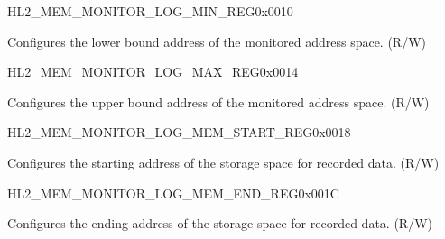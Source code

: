 \begin{register}{H}{L2\_MEM\_MONITOR\_LOG\_MIN\_REG}{0x0010}\label{regdesc:L2MEMMONITORLOGMINREG}
%
\regnewline%
\begin{regdesc}\begin{reglist}
\label{fielddesc:L2MEMMONITORLOGMIN}\item [L2\_MEM\_MONITOR\_LOG\_MIN] Configures the lower bound address of the monitored address space. (R/W)
\end{reglist}\end{regdesc}
\end{register}


\begin{register}{H}{L2\_MEM\_MONITOR\_LOG\_MAX\_REG}{0x0014}\label{regdesc:L2MEMMONITORLOGMAXREG}
%
\regnewline%
\begin{regdesc}\begin{reglist}
\label{fielddesc:L2MEMMONITORLOGMAX}\item [L2\_MEM\_MONITOR\_LOG\_MAX] Configures the upper bound address of the monitored address space. (R/W)
\end{reglist}\end{regdesc}
\end{register}


\begin{register}{H}{L2\_MEM\_MONITOR\_LOG\_MEM\_START\_REG}{0x0018}\label{regdesc:L2MEMMONITORLOGMEMSTARTREG}
%
\regnewline%
\begin{regdesc}\begin{reglist}
\label{fielddesc:L2MEMMONITORLOGMEMSTART}\item [L2\_MEM\_MONITOR\_LOG\_MEM\_START] Configures the starting address of the storage space for recorded data. (R/W)
\end{reglist}\end{regdesc}
\end{register}


\begin{register}{H}{L2\_MEM\_MONITOR\_LOG\_MEM\_END\_REG}{0x001C}\label{regdesc:L2MEMMONITORLOGMEMENDREG}
%
\regnewline%
\begin{regdesc}\begin{reglist}
\label{fielddesc:L2MEMMONITORLOGMEMEND}\item [L2\_MEM\_MONITOR\_LOG\_MEM\_END] Configures the ending address of the storage space for recorded data. (R/W)
\end{reglist}\end{regdesc}
\end{register}


